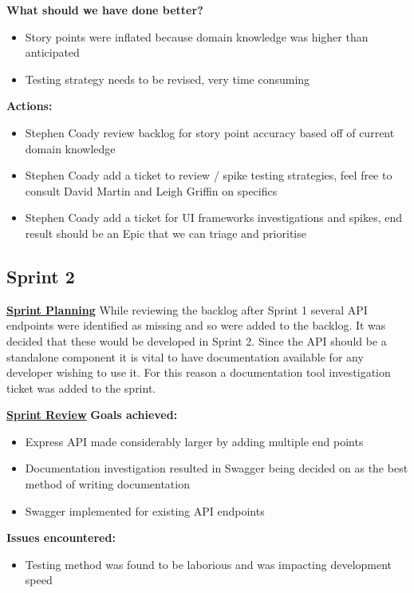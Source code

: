 \textbf{What should we have done better?}
\begin{itemize}
	\item Story points were inflated because domain knowledge was higher than anticipated
	\item Testing strategy needs to be revised, very time consuming
\end{itemize}

\textbf{Actions:}
\begin{itemize}
	\item Stephen Coady review backlog for story point accuracy based off of current domain knowledge
	\item Stephen Coady add a ticket to review / spike testing strategies, feel free to consult David Martin and Leigh Griffin on specifics
	\item Stephen Coady add a ticket for UI frameworks investigations and spikes, end result should be an Epic that we can triage and prioritise
	\end{itemize}

\subsection{Sprint 2}
\underline{\textbf{Sprint Planning}}\newline
While reviewing the backlog after Sprint 1 several API endpoints were identified as missing and so were added to the backlog. It was decided that these would be developed in Sprint 2. Since the API should be a standalone component it is vital to have documentation available for any developer wishing to use it. For this reason a documentation tool investigation ticket was added to the sprint.

\underline{\textbf{Sprint Review}}\newline
\textbf{Goals achieved:}
\begin{itemize}
	\item Express API made considerably larger by adding multiple end points
	\item Documentation investigation resulted in Swagger being decided on as the best method of writing documentation \citep{Swagger2017} 
	\item Swagger implemented for existing API endpoints
\end{itemize}

\textbf{Issues encountered:}
\begin{itemize}
	\item Testing method was found to be laborious and was impacting development speed
\end{itemize}

